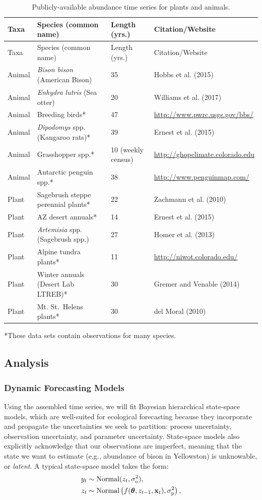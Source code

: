 \documentclass[12pt,]{article}
\begin{document}
\begin{longtable}[]{@{}llll@{}}
\caption{Publicly-available abundance time series for plants and
animals.}\tabularnewline
\toprule
Taxa & Species (common name) & Length (yrs.) &
Citation/Website\tabularnewline
\midrule
\endfirsthead
\toprule
Taxa & Species (common name) & Length (yrs.) &
Citation/Website\tabularnewline
\midrule
\endhead
Animal & \emph{Bison bison} (American Bison) & 35 & Hobbs et al.
(2015)\tabularnewline
Animal & \emph{Enhydra lutris} (Sea otter) & 20 & Williams et al.
(2017)\tabularnewline
Animal & Breeding birds* & 47 &
\url{http://www.pwrc.usgs.gov/bbs/}\tabularnewline
Animal & \emph{Dipodomys} spp. (Kangaroo rats)* & 39 & Ernest et al.
(2015)\tabularnewline
Animal & Grasshopper spp.* & 10 (weekly census) &
\url{http://ghopclimate.colorado.edu}\tabularnewline
Animal & Antarctic penguin spp.* & 38 &
\url{http://www.penguinmap.com/}\tabularnewline
Plant & Sagebrush steppe perennial plants* & 22 & Zachmann et al.
(2010)\tabularnewline
Plant & AZ desert annuals* & 14 & Ernest et al. (2015)\tabularnewline
Plant & \emph{Artemisia} spp. (Sagebrush spp.) & 27 & Homer et al.
(2013)\tabularnewline
Plant & Alpine tundra plants* & 11 &
\url{http://niwot.colorado.edu/}\tabularnewline
Plant & Winter annuals (Desert Lab LTREB)* & 30 & Gremer and Venable
(2014)\tabularnewline
Plant & Mt. St.~Helens plants* & 30 & del Moral (2010)\tabularnewline
\bottomrule
\end{longtable}

\vspace{-2em}

*These data sets contain observations for many species.

\normalsize

\subsection{Analysis}\subsubsection{Dynamic Forecasting Models}

Using the assembled time series, we will fit Bayesian hierarchical
state-space models, which are well-suited for ecological forecasting
because they incorporate and propagate the uncertainties we seek to
partition: process uncertainty, observation uncertainty, and parameter
uncertainty. State-space models also explicitly acknowledge that our
observations are imperfect, meaning that the state we want to estimate
(e.g., abundance of bison in Yellowston) is unknowable, or
\emph{latent}. A typical state-space model takes the form: \begin{align}
y_t &\sim \text{Normal}(z_t, \sigma^2_{\text{o}}), \\
z_t &\sim \text{Normal}\left(f(\boldsymbol{\theta},z_{t-1},\bold{x}_t), \sigma^2_{\text{p}}\right),
\end{align}
\end{document}
